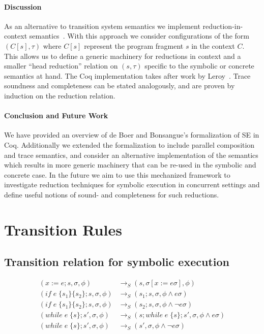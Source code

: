 \documentclass[submission,copyright,creativecommons]{eptcs}
\begin{document}
\paragraph{Discussion}
As an alternative to transition system semantics we implement reduction-in-context semantics~\cite{FELLEISEN1992235}.
With this approach we consider configurations of the form $(C[s], \tau)$ where $C[s]$ represent the program fragment
$s$ in the context $C$. This allows us to define a generic machinery for reductions in context and a smaller
``head reduction'' relation on $(s, \tau)$ specific to the symbolic or concrete semantics at hand.
The Coq implementation takes after work by Leroy~\cite{Leroy2020}.
Trace soundness and completeness can be stated analogously, and are proven by induction on the reduction relation.

\paragraph{Conclusion and Future Work}
We have provided an overview of de Boer and Bonsangue's formalization of SE in Coq.
Additionally we extended the formalization to include parallel composition and trace semantics,
and consider an alternative implementation of the semantics which results in more generic machinery
that can be re-used in the symbolic and concrete case.
In the future we aim to use this mechanized framework to investigate reduction techniques for symbolic
execution in concurrent settings and define useful notions of sound- and completeness for such reductions.




\appendix
\section{Transition Rules}
\subsection{Transition relation for symbolic execution}
\begin{align*}
(x := e ; s, \sigma, \phi) & \rightarrow_{S} (s, \sigma[x := e\sigma], \phi) \\
(if \;e\; \{s_{1}\} \{s_{2}\} ; s, \sigma, \phi) & \rightarrow_{S} (s_{1} ; s, \sigma, \phi \land e\sigma) \\
(if \;e\; \{s_{1}\} \{s_{2}\} ; s, \sigma, \phi) & \rightarrow_{S} (s_{2} ; s, \sigma, \phi \land \neg e\sigma) \\
(while \;e\; \{s\} ; s', \sigma, \phi) & \rightarrow_{S} ( s ; while \;e\; \{s\} ; s', \sigma, \phi \land e\sigma) \\
(while \;e\; \{s\} ; s', \sigma, \phi) & \rightarrow_{S} (s', \sigma, \phi \land \neg e\sigma)
\end{align*}
\end{document}

